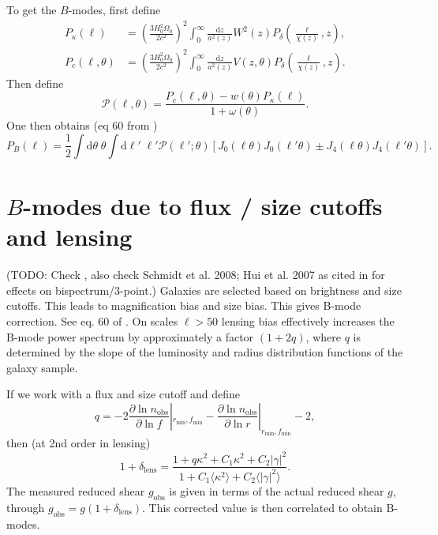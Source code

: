 \documentclass[11pt]{book}
\begin{document}
To get the $B$-modes, first define
\begin{align*}
    P_{\kappa}(\ell) &= \left ( \frac{3H_0^2\Omega_0}{2c^2} \right )^2 \int_0^\infty \frac{\mathrm d z}{a^2(z)} W^2(z)P_\delta \left (\frac{\ell}{\chi(z)}, z \right ) ,\\
    P_{c}(\ell, \theta) &= \left ( \frac{3H_0^2\Omega_0}{2c^2} \right )^2 \int_0^\infty \frac{\mathrm d z}{a^2(z)} V(z, \theta)P_\delta \left (\frac{\ell}{\chi(z)}, z \right ).
\end{align*}
Then define
\begin{equation*}
    \mathcal P(\ell, \theta)= \frac{P_c(\ell,\theta) - w(\theta)P_{\kappa}(\ell)}{1+\omega(\theta)}.
\end{equation*}
One then obtains (eq 60 from \cite{Schneider_2002}) 
\begin{equation*}
    P_B(\ell)=\frac{1}{2}\int\mathrm d \theta\;\theta \int \mathrm d \ell' \; \ell' \mathcal P(\ell'; \theta)[J_0(\ell\theta)J_0(\ell'\theta)\pm J_4(\ell\theta)J_4(\ell'\theta)].
\end{equation*}

\section{$B$-modes due to flux / size cutoffs and lensing}
(TODO: Check \cite{Bartelmann_2001}, also check Schmidt et al. 2008; Hui et al. 2007 as cited in \cite{Krause_2010} for effects on bispectrum/3-point.) Galaxies are selected based on brightness and size cutoffs. This leads to magnification bias and size bias. This gives B-mode correction. See eq. 60 of \cite{Krause_2010}. On scales $\ell>50$ lensing bias effectively increases the B-mode power spectrum by approximately a factor $(1 + 2q)$, where $q$ is determined by the slope of the luminosity and radius distribution functions of the galaxy sample.

If we work with a flux and size cutoff and define \cite{Schmidt_2009}
\begin{equation*}
    q=-2\frac{\partial \ln n_{\text{obs}}}{\partial \ln f}|_{r_{\min}, f_{\min}} - \frac{\partial \ln n_{\text{obs}}}{\partial \ln r}|_{r_{\min}, f_{\min}} - 2,
\end{equation*} then (at 2nd order in lensing)
\begin{equation*}
    1+\delta_{\text{lens}} = \frac{1+q\kappa^2 + C_1\kappa^2+C_2|\gamma|^2}{1+C_1\langle \kappa^2\rangle + C_2\langle |\gamma|^2\rangle}.
\end{equation*}
The measured reduced shear $g_{\text{obs}}$ is given in terms of the actual reduced shear $g$, through $g_{\text{obs}}=g(1+\delta_{\text{lens}})$. This corrected value is then correlated to obtain B-modes.
\end{document}
